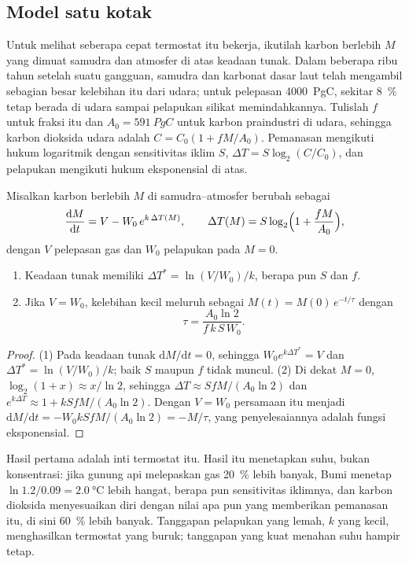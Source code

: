 \subsection*{Model satu kotak}

Untuk melihat seberapa cepat termostat itu bekerja, ikutilah karbon berlebih $M$ yang dimuat samudra dan atmosfer
di atas keadaan tunak. Dalam beberapa ribu tahun setelah suatu gangguan, samudra dan karbonat dasar
laut telah mengambil sebagian besar kelebihan itu dari udara; untuk pelepasan \qty{4000}{PgC}, sekitar
\qty{8}{\percent} tetap berada di udara sampai pelapukan silikat memindahkannya. Tulislah $f$ untuk
fraksi itu dan $A_0 = \qty{591}{PgC}$ untuk karbon praindustri di udara, sehingga karbon dioksida
udara adalah $C = C_0(1 + fM/A_0)$. Pemanasan mengikuti hukum logaritmik dengan sensitivitas
iklim $S$, $\Delta T = S\log_2(C/C_0)$, dan pelapukan mengikuti hukum eksponensial di atas.

\begin{proposition}\label{prop:b2:deep-time-climate:thermostat}
Misalkan karbon berlebih $M$ di samudra--atmosfer berubah sebagai
\[
  \frac{\mathrm dM}{\mathrm dt} = V - W_0\,e^{k\,\Delta T(M)}, \qquad
  \Delta T(M) = S\log_2\Bigl(1 + \frac{fM}{A_0}\Bigr),
\]
dengan $V$ pelepasan gas dan $W_0$ pelapukan pada $M = 0$.
\begin{enumerate}
  \item Keadaan tunak memiliki $\Delta T^* = \ln(V/W_0)/k$, berapa pun $S$ dan $f$.
  \item Jika $V = W_0$, kelebihan kecil meluruh sebagai $M(t) = M(0)\,e^{-t/\tau}$ dengan
        \[
          \tau = \frac{A_0 \ln 2}{f\,k\,S\,W_0} .
        \]
\end{enumerate}
\end{proposition}

\begin{proof}
(1) Pada keadaan tunak $\mathrm dM/\mathrm dt = 0$, sehingga $W_0e^{k\Delta T^*} = V$ dan $\Delta T^* =
\ln(V/W_0)/k$; baik $S$ maupun $f$ tidak muncul. (2) Di dekat $M = 0$, $\log_2(1 + x) \approx x/\ln 2$, sehingga
$\Delta T \approx SfM/(A_0\ln 2)$ dan $e^{k\Delta T} \approx 1 + kSfM/(A_0\ln2)$. Dengan $V = W_0$
persamaan itu menjadi $\mathrm dM/\mathrm dt = -W_0kSfM/(A_0\ln 2) = -M/\tau$, yang penyelesaiannya adalah
fungsi eksponensial.
\end{proof}

Hasil pertama adalah inti termostat itu. Hasil itu menetapkan suhu, bukan konsentrasi: jika
gunung api melepaskan gas \qty{20}{\percent} lebih banyak, Bumi menetap $\ln 1.2/0.09 = \qty{2.0}{\celsius}$
lebih hangat, berapa pun sensitivitas iklimnya, dan karbon dioksida menyesuaikan diri dengan nilai apa pun yang memberikan pemanasan
itu, di sini \qty{60}{\percent} lebih banyak. Tanggapan pelapukan yang lemah, $k$ yang kecil, menghasilkan termostat
yang buruk; tanggapan yang kuat menahan suhu hampir tetap.

